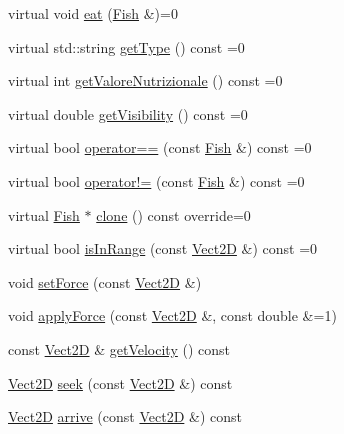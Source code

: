 \begin{DoxyCompactItemize}
\item 
virtual void \hyperlink{classFish_ae551e094ddda73e896de484dcb460412_ae551e094ddda73e896de484dcb460412}{eat} (\hyperlink{classFish}{Fish} \&)=0
\item 
virtual std\+::string \hyperlink{classFish_adb00fb6bac2fad27660107c12d1a7fa2_adb00fb6bac2fad27660107c12d1a7fa2}{get\+Type} () const =0
\item 
virtual int \hyperlink{classFish_a97dd71f31af1e36a630944c5c5b8ff33_a97dd71f31af1e36a630944c5c5b8ff33}{get\+Valore\+Nutrizionale} () const =0
\item 
virtual double \hyperlink{classFish_a6c20ea483d1f6237ebf01aee3f2b6e88_a6c20ea483d1f6237ebf01aee3f2b6e88}{get\+Visibility} () const =0
\item 
virtual bool \hyperlink{classFish_a3abf96fe9cda276a4b3827464e2b0519_a3abf96fe9cda276a4b3827464e2b0519}{operator==} (const \hyperlink{classFish}{Fish} \&) const =0
\item 
virtual bool \hyperlink{classFish_aa739aa5c06ff6054b051047bccd3bf6f_aa739aa5c06ff6054b051047bccd3bf6f}{operator!=} (const \hyperlink{classFish}{Fish} \&) const =0
\item 
virtual \hyperlink{classFish}{Fish} $\ast$ \hyperlink{classFish_a6732945f7373a28b1723e55de8a65e13_a6732945f7373a28b1723e55de8a65e13}{clone} () const override=0
\item 
virtual bool \hyperlink{classFish_a65e3b0bf5b211be6c4048aa5939331e1_a65e3b0bf5b211be6c4048aa5939331e1}{is\+In\+Range} (const \hyperlink{classVect2D}{Vect2D} \&) const =0
\item 
void \hyperlink{classVehicle_a03e22c522e6f526f95428c81d0762833_a03e22c522e6f526f95428c81d0762833}{set\+Force} (const \hyperlink{classVect2D}{Vect2D} \&)
\item 
void \hyperlink{classVehicle_a82fbbd5aafc1ba89c3daa4da09989bbe_a82fbbd5aafc1ba89c3daa4da09989bbe}{apply\+Force} (const \hyperlink{classVect2D}{Vect2D} \&, const double \&=1)
\item 
const \hyperlink{classVect2D}{Vect2D} \& \hyperlink{classVehicle_a87b8266cb3495e8444233a0724e1bf07_a87b8266cb3495e8444233a0724e1bf07}{get\+Velocity} () const
\item 
\hyperlink{classVect2D}{Vect2D} \hyperlink{classVehicle_a86c0b5ddcf64443bc090657cd29832bf_a86c0b5ddcf64443bc090657cd29832bf}{seek} (const \hyperlink{classVect2D}{Vect2D} \&) const
\item 
\hyperlink{classVect2D}{Vect2D} \hyperlink{classVehicle_a55f8bb6cfbdd97219c2cea6cf3ad3826_a55f8bb6cfbdd97219c2cea6cf3ad3826}{arrive} (const \hyperlink{classVect2D}{Vect2D} \&) const

\end{DoxyCompactItemize}
